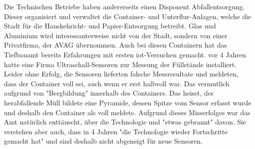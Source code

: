 Die Technischen Betriebe haben andererseits einen Disponent Abfallentsorgung. Dieser organisiert und verwaltet die Container- und Unterflur-Anlagen, welche die Stadt für die Hauskehricht- und Papier-Entsorgung betreibt. Glas und Aluminium wird interessanterweise nicht von der Stadt, sondern von einer Privatfirma, der AVAG übernommen.
Auch bei diesen Containern hat das Tiefbauamt bereits Erfahrungen mit ersten \gls{iot}-Versuchen gemacht. vor 4 Jahren hatte eine Firma Ultraschall-Sensoren zur Messung der Füllstände installiert. Leider ohne Erfolg, die Sensoren lieferten falsche Messresultate und meldeten, dass der Container voll sei, auch wenn er erst halbvoll war. Das vermutlich aufgrund von "Bergbildung" innerhalb des Containers. Das heisst, der herabfallende Müll bildete eine Pyramide, dessen Spitze vom Sensor erfasst wurde und deshalb den Container als voll meldete. Aufgrund dieses Misserfolges war das Amt natürlich enttäuscht, über die Technologie und "etwas gebrannt" davon. Sie verstehen aber auch, dass in 4 Jahren "die Technologie wieder Fortschritte gemacht hat" und sind deshalb nicht abgeneigt für neue Sensoren.

